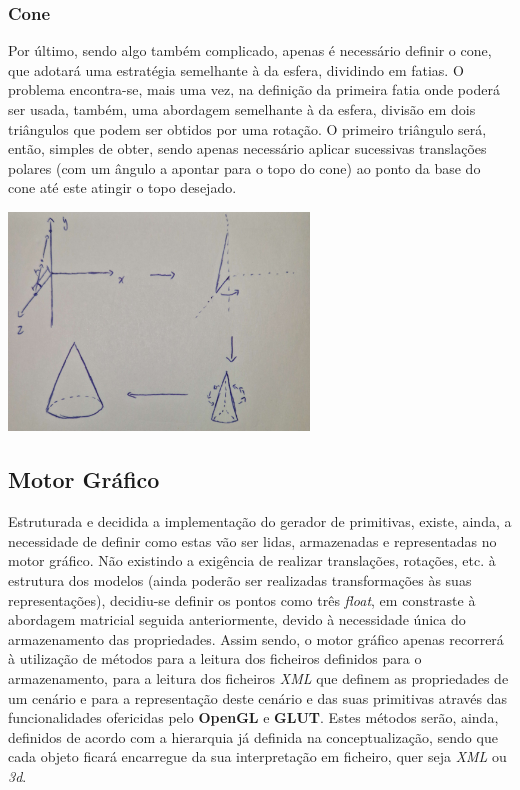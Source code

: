 \subsubsection{Cone}

Por último, sendo algo também complicado, apenas é necessário definir o
cone, que adotará uma estratégia semelhante à da esfera, dividindo em
fatias.\newline
\break
\noindent
O problema encontra-se, mais uma vez, na definição da primeira fatia
onde poderá ser usada, também, uma abordagem semelhante à da esfera,
divisão em dois triângulos que podem ser obtidos por uma rotação.\newline
\break
\noindent
O primeiro triângulo será, então, simples de obter, sendo apenas
necessário aplicar sucessivas translações polares (com um ângulo a 
apontar para o topo do cone) ao ponto da base do cone até este atingir
o topo desejado.\newline
\break

\begin{center}
    \includegraphics[width=0.6\textwidth]{imgs/cone.png}
    \label{fig:cone}
\end{center}

\subsection{Motor Gráfico}

Estruturada e decidida a implementação do gerador de primitivas, existe,
ainda, a necessidade de definir como estas vão ser lidas, armazenadas e
representadas no motor gráfico.\newline
\break
\noindent
Não existindo a exigência de realizar translações, rotações, etc. à
estrutura dos modelos (ainda poderão ser realizadas transformações às suas
representações), decidiu-se definir os pontos como três \textit{float},
em constraste à abordagem matricial seguida anteriormente, devido à
necessidade única do armazenamento das propriedades.\newline
\break
\noindent
Assim sendo, o motor gráfico apenas recorrerá à utilização de métodos para
a leitura dos ficheiros definidos para o armazenamento, para a leitura dos
ficheiros \textit{XML} que definem as propriedades de um cenário
e para a representação deste cenário e das suas primitivas
através das funcionalidades ofericidas pelo
\textbf{OpenGL} e \textbf{GLUT}.\newline
\break
\noindent
Estes métodos serão, ainda, definidos de acordo com a hierarquia
já definida na conceptualização, sendo que cada objeto ficará
encarregue da sua interpretação em ficheiro, quer seja \textit{XML}
ou \textit{3d}.
